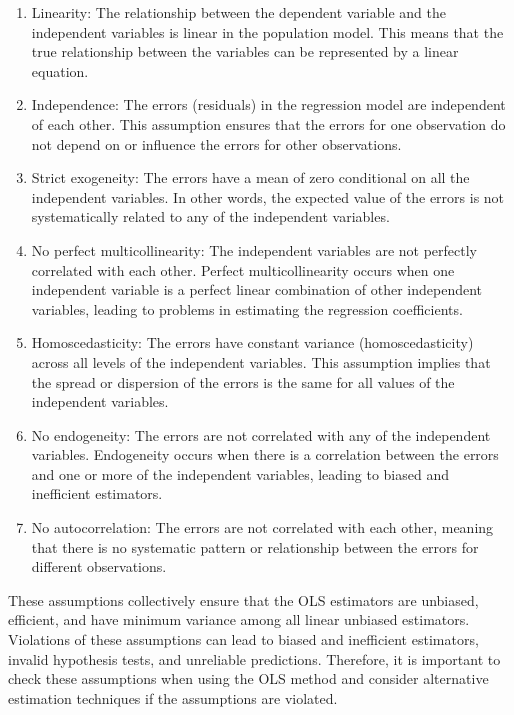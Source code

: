 \documentclass[
  12pt,
  oneside]{book}
\theoremstyle{definition}
\theoremstyle{definition}
\theoremstyle{definition}
\theoremstyle{definition}
\theoremstyle{remark}
\begin{document}
\begin{enumerate}
\def\labelenumi{\arabic{enumi}.}
\item
  Linearity: The relationship between the dependent variable and the independent variables is linear in the population model. This means that the true relationship between the variables can be represented by a linear equation.
\item
  Independence: The errors (residuals) in the regression model are independent of each other. This assumption ensures that the errors for one observation do not depend on or influence the errors for other observations.
\item
  Strict exogeneity: The errors have a mean of zero conditional on all the independent variables. In other words, the expected value of the errors is not systematically related to any of the independent variables.
\item
  No perfect multicollinearity: The independent variables are not perfectly correlated with each other. Perfect multicollinearity occurs when one independent variable is a perfect linear combination of other independent variables, leading to problems in estimating the regression coefficients.
\item
  Homoscedasticity: The errors have constant variance (homoscedasticity) across all levels of the independent variables. This assumption implies that the spread or dispersion of the errors is the same for all values of the independent variables.
\item
  No endogeneity: The errors are not correlated with any of the independent variables. Endogeneity occurs when there is a correlation between the errors and one or more of the independent variables, leading to biased and inefficient estimators.
\item
  No autocorrelation: The errors are not correlated with each other, meaning that there is no systematic pattern or relationship between the errors for different observations.
\end{enumerate}

These assumptions collectively ensure that the OLS estimators are unbiased, efficient, and have minimum variance among all linear unbiased estimators. Violations of these assumptions can lead to biased and inefficient estimators, invalid hypothesis tests, and unreliable predictions. Therefore, it is important to check these assumptions when using the OLS method and consider alternative estimation techniques if the assumptions are violated.
\end{document}
